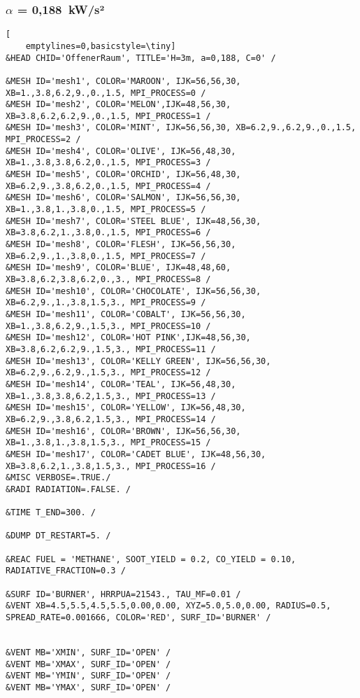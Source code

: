 \subsubsection{$\alpha$ = 0,188~kW/s²}
\begin{lstlisting}[
    emptylines=0,basicstyle=\tiny]
&HEAD CHID='OffenerRaum', TITLE='H=3m, a=0,188, C=0' /

&MESH ID='mesh1', COLOR='MAROON', IJK=56,56,30, XB=1.,3.8,6.2,9.,0.,1.5, MPI_PROCESS=0 /
&MESH ID='mesh2', COLOR='MELON',IJK=48,56,30, XB=3.8,6.2,6.2,9.,0.,1.5, MPI_PROCESS=1 /
&MESH ID='mesh3', COLOR='MINT', IJK=56,56,30, XB=6.2,9.,6.2,9.,0.,1.5, MPI_PROCESS=2 /
&MESH ID='mesh4', COLOR='OLIVE', IJK=56,48,30, XB=1.,3.8,3.8,6.2,0.,1.5, MPI_PROCESS=3 /
&MESH ID='mesh5', COLOR='ORCHID', IJK=56,48,30, XB=6.2,9.,3.8,6.2,0.,1.5, MPI_PROCESS=4 /
&MESH ID='mesh6', COLOR='SALMON', IJK=56,56,30, XB=1.,3.8,1.,3.8,0.,1.5, MPI_PROCESS=5 /
&MESH ID='mesh7', COLOR='STEEL BLUE', IJK=48,56,30, XB=3.8,6.2,1.,3.8,0.,1.5, MPI_PROCESS=6 /
&MESH ID='mesh8', COLOR='FLESH', IJK=56,56,30, XB=6.2,9.,1.,3.8,0.,1.5, MPI_PROCESS=7 /
&MESH ID='mesh9', COLOR='BLUE', IJK=48,48,60, XB=3.8,6.2,3.8,6.2,0.,3., MPI_PROCESS=8 /
&MESH ID='mesh10', COLOR='CHOCOLATE', IJK=56,56,30, XB=6.2,9.,1.,3.8,1.5,3., MPI_PROCESS=9 /
&MESH ID='mesh11', COLOR='COBALT', IJK=56,56,30, XB=1.,3.8,6.2,9.,1.5,3., MPI_PROCESS=10 /
&MESH ID='mesh12', COLOR='HOT PINK',IJK=48,56,30, XB=3.8,6.2,6.2,9.,1.5,3., MPI_PROCESS=11 /
&MESH ID='mesh13', COLOR='KELLY GREEN', IJK=56,56,30, XB=6.2,9.,6.2,9.,1.5,3., MPI_PROCESS=12 /
&MESH ID='mesh14', COLOR='TEAL', IJK=56,48,30, XB=1.,3.8,3.8,6.2,1.5,3., MPI_PROCESS=13 /
&MESH ID='mesh15', COLOR='YELLOW', IJK=56,48,30, XB=6.2,9.,3.8,6.2,1.5,3., MPI_PROCESS=14 /
&MESH ID='mesh16', COLOR='BROWN', IJK=56,56,30, XB=1.,3.8,1.,3.8,1.5,3., MPI_PROCESS=15 /
&MESH ID='mesh17', COLOR='CADET BLUE', IJK=48,56,30, XB=3.8,6.2,1.,3.8,1.5,3., MPI_PROCESS=16 /
&MISC VERBOSE=.TRUE./
&RADI RADIATION=.FALSE. /

&TIME T_END=300. /

&DUMP DT_RESTART=5. /

&REAC FUEL = 'METHANE', SOOT_YIELD = 0.2, CO_YIELD = 0.10, RADIATIVE_FRACTION=0.3 /

&SURF ID='BURNER', HRRPUA=21543., TAU_MF=0.01 /
&VENT XB=4.5,5.5,4.5,5.5,0.00,0.00, XYZ=5.0,5.0,0.00, RADIUS=0.5, SPREAD_RATE=0.001666, COLOR='RED', SURF_ID='BURNER' /


&VENT MB='XMIN', SURF_ID='OPEN' /  
&VENT MB='XMAX', SURF_ID='OPEN' /  
&VENT MB='YMIN', SURF_ID='OPEN' /  
&VENT MB='YMAX', SURF_ID='OPEN' / 
 

\end{lstlisting}
